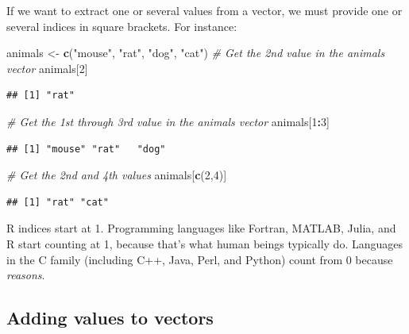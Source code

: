 \documentclass[]{book}
\newenvironment{Shaded}{\begin{snugshade}}{\end{snugshade}}
\newcommand{\CommentTok}[1]{\textcolor[rgb]{0.56,0.35,0.01}{\textit{#1}}}
\newcommand{\DecValTok}[1]{\textcolor[rgb]{0.00,0.00,0.81}{#1}}
\newcommand{\KeywordTok}[1]{\textcolor[rgb]{0.13,0.29,0.53}{\textbf{#1}}}
\newcommand{\NormalTok}[1]{#1}
\newcommand{\OperatorTok}[1]{\textcolor[rgb]{0.81,0.36,0.00}{\textbf{#1}}}
\newcommand{\StringTok}[1]{\textcolor[rgb]{0.31,0.60,0.02}{#1}}
\begin{document}
If we want to extract one or several values from a vector, we must provide one or several indices in square brackets. For instance:

\begin{Shaded}
\begin{Highlighting}[]
\NormalTok{animals <-}\StringTok{ }\KeywordTok{c}\NormalTok{(}\StringTok{"mouse"}\NormalTok{, }\StringTok{"rat"}\NormalTok{, }\StringTok{"dog"}\NormalTok{, }\StringTok{"cat"}\NormalTok{)}
\CommentTok{# Get the 2nd value in the animals vector}
\NormalTok{animals[}\DecValTok{2}\NormalTok{]}
\end{Highlighting}
\end{Shaded}

\begin{verbatim}
## [1] "rat"
\end{verbatim}

\begin{Shaded}
\begin{Highlighting}[]
\CommentTok{# Get the 1st through 3rd value in the animals vector}
\NormalTok{animals[}\DecValTok{1}\OperatorTok{:}\DecValTok{3}\NormalTok{]}
\end{Highlighting}
\end{Shaded}

\begin{verbatim}
## [1] "mouse" "rat"   "dog"
\end{verbatim}

\begin{Shaded}
\begin{Highlighting}[]
\CommentTok{# Get the 2nd and 4th values}
\NormalTok{animals[}\KeywordTok{c}\NormalTok{(}\DecValTok{2}\NormalTok{,}\DecValTok{4}\NormalTok{)]}
\end{Highlighting}
\end{Shaded}

\begin{verbatim}
## [1] "rat" "cat"
\end{verbatim}

R indices start at 1. Programming languages like Fortran, MATLAB, Julia, and R start counting at 1, because that's what human beings typically do. Languages in the C family (including C++, Java, Perl, and Python) count from 0 because \emph{reasons}.

\hypertarget{adding-values-to-vectors}{%
\subsection*{Adding values to vectors}\label{adding-values-to-vectors}}
\end{document}
